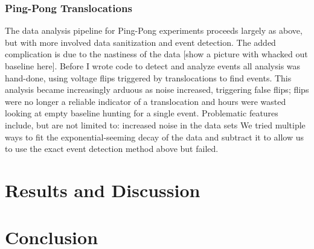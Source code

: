 \documentclass[aps,prl,preprint,groupedaddress]{revtex4}
\begin{document}
\subsubsection{Ping-Pong Translocations}

The data analysis pipeline for Ping-Pong experiments proceeds largely as above, but with more involved data sanitization and event detection.
The added complication is due to the nastiness of the data [show a picture with whacked out baseline here].
Before I wrote code to detect and analyze events all analysis was hand-done, using voltage flips triggered by translocations to find events.
This analysis became increasingly arduous as noise increased, triggering false flips; flips were no longer a reliable indicator of a translocation and hours were wasted looking at empty baseline hunting for a single event.
Problematic features include, but are not limited to: increased noise in the data sets 
We tried multiple ways to fit the exponential-seeming decay of the data and subtract it to allow us to use the exact event detection method above but failed.

\section{Results and Discussion}



\section{Conclusion}



%
\end{document}
